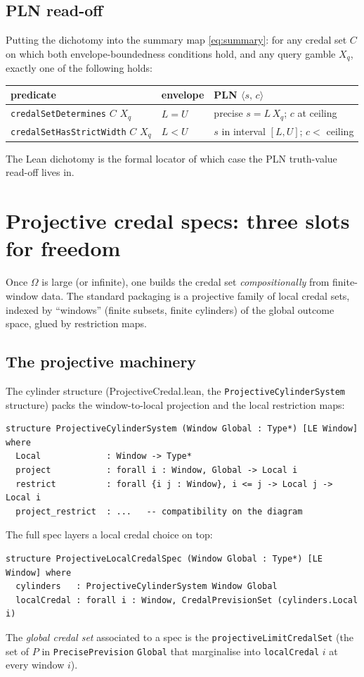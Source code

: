 \documentclass[]{article}
\newcommand{\lid}[1]{{\ttfamily\nolinkurl{#1}}}
\newcommand{\STV}[2]{\langle #1,\, #2 \rangle}
\begin{document}
\subsection{PLN read-off}\label{sec:plnreadoff}

Putting the dichotomy into the summary map \eqref{eq:summary}: for any
credal set $C$ on which both envelope-boundedness conditions hold, and any
query gamble $X_q$, exactly one of the following holds:
\begin{center}
\begin{tabular}{lll}
\toprule
predicate & envelope & PLN $\STV{s}{c}$ \\
\midrule
\lid{credalSetDetermines} $C$ $X_q$ & $L = U$ & precise $s = L\,X_q$; $c$ at ceiling \\
\lid{credalSetHasStrictWidth} $C$ $X_q$ & $L < U$ & $s$ in interval $[L, U]$; $c < $ ceiling \\
\bottomrule
\end{tabular}
\end{center}
The Lean dichotomy is the formal locator of which case the PLN truth-value
read-off lives in.

\section{Projective credal specs: three slots for freedom}\label{sec:projective}

Once $\Omega$ is large (or infinite), one builds the credal set
\emph{compositionally} from finite-window data. The standard packaging
is a projective family of local credal sets, indexed by ``windows''
(finite subsets, finite cylinders) of the global outcome space, glued
by restriction maps.

\subsection{The projective machinery}

The cylinder structure (ProjectiveCredal.lean, the
\lid{ProjectiveCylinderSystem} structure) packs the window-to-local
projection and the local restriction maps:
\begin{lstlisting}
structure ProjectiveCylinderSystem (Window Global : Type*) [LE Window] where
  Local             : Window -> Type*
  project           : forall i : Window, Global -> Local i
  restrict          : forall {i j : Window}, i <= j -> Local j -> Local i
  project_restrict  : ...   -- compatibility on the diagram
\end{lstlisting}
The full spec layers a local credal choice on top:
\begin{lstlisting}
structure ProjectiveLocalCredalSpec (Window Global : Type*) [LE Window] where
  cylinders   : ProjectiveCylinderSystem Window Global
  localCredal : forall i : Window, CredalPrevisionSet (cylinders.Local i)
\end{lstlisting}
The \emph{global credal set} associated to a spec is the
\lid{projectiveLimitCredalSet} (the set of $P$ in \lid{PrecisePrevision}
\lid{Global} that marginalise into \lid{localCredal}{} $i$ at every window
$i$).
\end{document}
